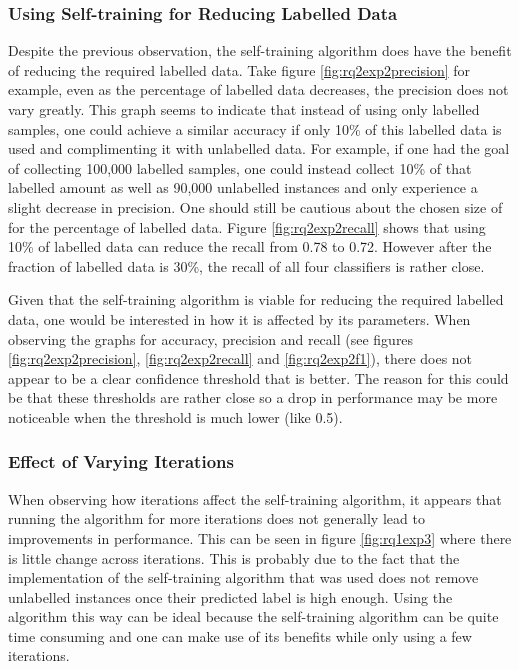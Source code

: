 \documentclass[../main.tex]{subfiles}
\begin{document}
\subsubsection{Using Self-training for Reducing Labelled Data}

Despite the previous observation, the self-training algorithm does have the benefit of reducing the required labelled data. Take figure \ref{fig:rq2exp2precision} for example, even as the percentage of labelled data decreases, the precision does not vary greatly. This graph seems to indicate that instead of using only labelled samples, one could achieve a similar accuracy if only 10\% of this labelled data is used and complimenting it with unlabelled data. For example, if one had the goal of collecting 100,000 labelled samples, one could instead collect 10\% of that labelled amount as well as 90,000 unlabelled instances and only experience a slight decrease in precision. One should still be cautious about the chosen size of for the percentage of labelled data. Figure \ref{fig:rq2exp2recall} shows that using 10\% of labelled data can reduce the recall from 0.78 to 0.72. However after the fraction of labelled data is 30\%, the recall of all four classifiers is rather close.

Given that the self-training algorithm is viable for reducing the required labelled data, one would be interested in how it is affected by its parameters. When observing the graphs for accuracy, precision and recall (see figures \ref{fig:rq2exp2precision}, \ref{fig:rq2exp2recall} and \ref{fig:rq2exp2f1}), there does not appear to be a clear confidence threshold that is better. The reason for this could be that these thresholds are rather close so a drop in performance may be more noticeable when the threshold is much lower (like 0.5). 

\subsubsection{Effect of Varying Iterations}

When observing how iterations affect the self-training algorithm, it appears that running the algorithm for more iterations does not generally lead to improvements in performance. This can be seen in figure \ref{fig:rq1exp3} where there is little change across iterations. This is probably due to the fact that the implementation of the self-training algorithm that was used does not remove unlabelled instances once their predicted label is high enough. Using the algorithm this way can be ideal because the self-training algorithm can be quite time consuming and one can make use of its benefits while only using a few iterations. 
\end{document}
